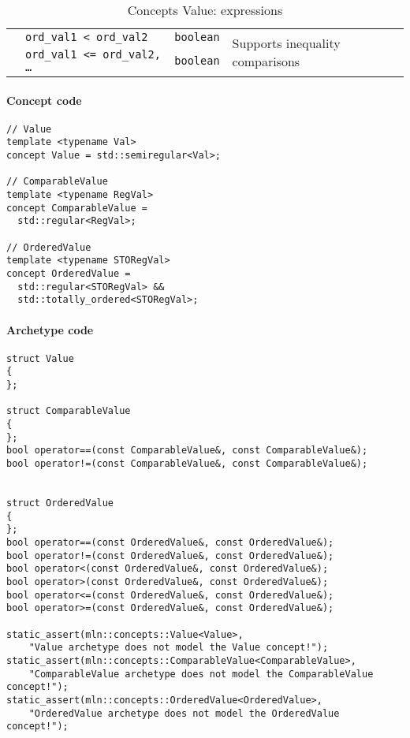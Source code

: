\begin{table}[H]
\begin{scriptsize}
\begin{tabular}{llll}
      \multicolumn{1}{c|}{}                                 & \texttt{ord\_val1 < ord\_val2}                                       & \texttt{boolean}
                                                            & \multicolumn{1}{l}{\multirow{2}{*}{Supports inequality comparisons}}                    \\
      \multicolumn{1}{c|}{}                                 & \texttt{ord\_val1 <= ord\_val2, \dots}                               & \texttt{boolean}
                                                            & \multicolumn{1}{l}{}                                                                    \\
      \cline{1-4}
    \end{tabular}
    \smallskip

    \caption{Concepts Value: expressions}
  \end{scriptsize}
  \label{table:concept.value.expressions}
\end{table}

\paragraph{Concept code}
\begin{verbatim}
// Value
template <typename Val>
concept Value = std::semiregular<Val>;

// ComparableValue
template <typename RegVal>
concept ComparableValue =
  std::regular<RegVal>;

// OrderedValue
template <typename STORegVal>
concept OrderedValue =
  std::regular<STORegVal> &&
  std::totally_ordered<STORegVal>;
\end{verbatim}

\paragraph{Archetype code}

\begin{verbatim}
struct Value
{
};

struct ComparableValue
{
};
bool operator==(const ComparableValue&, const ComparableValue&);
bool operator!=(const ComparableValue&, const ComparableValue&);


struct OrderedValue
{
};
bool operator==(const OrderedValue&, const OrderedValue&);
bool operator!=(const OrderedValue&, const OrderedValue&);
bool operator<(const OrderedValue&, const OrderedValue&);
bool operator>(const OrderedValue&, const OrderedValue&);
bool operator<=(const OrderedValue&, const OrderedValue&);
bool operator>=(const OrderedValue&, const OrderedValue&);

static_assert(mln::concepts::Value<Value>,
    "Value archetype does not model the Value concept!");
static_assert(mln::concepts::ComparableValue<ComparableValue>,
    "ComparableValue archetype does not model the ComparableValue concept!");
static_assert(mln::concepts::OrderedValue<OrderedValue>,
    "OrderedValue archetype does not model the OrderedValue concept!");
\end{verbatim}


